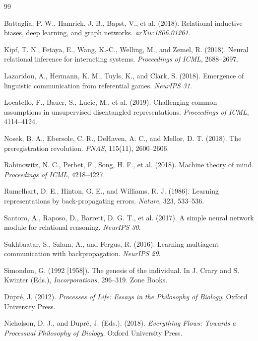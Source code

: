 \documentclass[11pt,a4paper]{article}
\begin{document}
\renewcommand{\refname}{Selected references}
\begin{thebibliography}{99}

Battaglia, P. W., Hamrick, J. B., Bapst, V., et al. (2018). Relational inductive biases, deep learning, and graph networks. \emph{arXiv:1806.01261}.

Kipf, T. N., Fetaya, E., Wang, K.-C., Welling, M., and Zemel, R. (2018). Neural relational inference for interacting systems. \emph{Proceedings of ICML}, 2688--2697.

Lazaridou, A., Hermann, K. M., Tuyls, K., and Clark, S. (2018). Emergence of linguistic communication from referential games. \emph{NeurIPS 31}.

Locatello, F., Bauer, S., Lucic, M., et al. (2019). Challenging common assumptions in unsupervised disentangled representations. \emph{Proceedings of ICML}, 4114--4124.

Nosek, B. A., Ebersole, C. R., DeHaven, A. C., and Mellor, D. T. (2018). The preregistration revolution. \emph{PNAS}, 115(11), 2600--2606.

Rabinowitz, N. C., Perbet, F., Song, H. F., et al. (2018). Machine theory of mind. \emph{Proceedings of ICML}, 4218--4227.

Rumelhart, D. E., Hinton, G. E., and Williams, R. J. (1986). Learning representations by back-propagating errors. \emph{Nature}, 323, 533--536.

Santoro, A., Raposo, D., Barrett, D. G. T., et al. (2017). A simple neural network module for relational reasoning. \emph{NeurIPS 30}.

Sukhbaatar, S., Szlam, A., and Fergus, R. (2016). Learning multiagent communication with backpropagation. \emph{NeurIPS 29}.

Simondon, G. (1992 [1958]). The genesis of the individual. In J. Crary and S. Kwinter (Eds.), \emph{Incorporations}, 296--319. Zone Books.

Dupr\'e, J. (2012). \emph{Processes of Life: Essays in the Philosophy of Biology}. Oxford University Press.

Nicholson, D. J., and Dupr\'e, J. (Eds.). (2018). \emph{Everything Flows: Towards a Processual Philosophy of Biology}. Oxford University Press.


\end{thebibliography}
\end{document}
